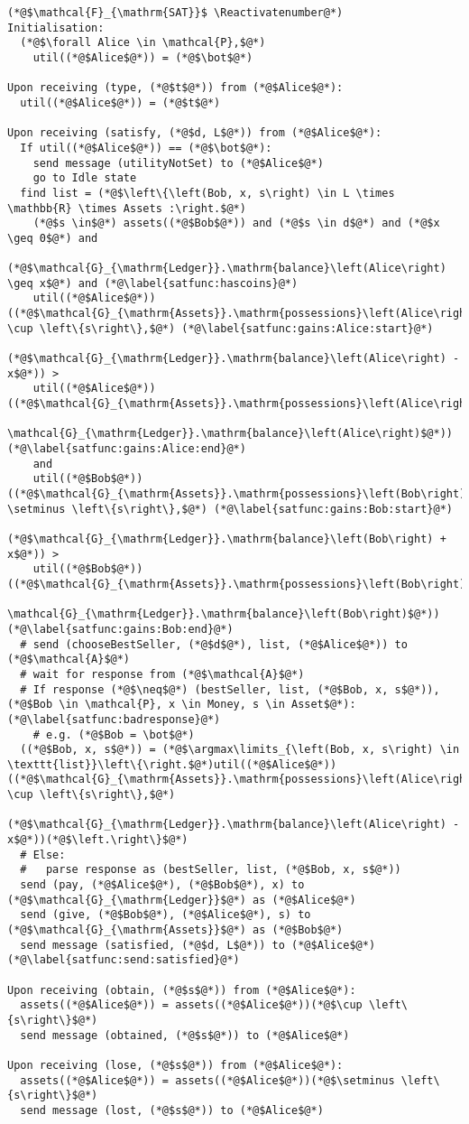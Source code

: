 \Suppressnumber
\begin{lstlisting}[label=satfunc, style=numbers]
(*@$\mathcal{F}_{\mathrm{SAT}}$ \Reactivatenumber@*)
Initialisation:
  (*@$\forall Alice \in \mathcal{P},$@*)
    util((*@$Alice$@*)) = (*@$\bot$@*)

Upon receiving (type, (*@$t$@*)) from (*@$Alice$@*):
  util((*@$Alice$@*)) = (*@$t$@*)

Upon receiving (satisfy, (*@$d, L$@*)) from (*@$Alice$@*):
  If util((*@$Alice$@*)) == (*@$\bot$@*):
    send message (utilityNotSet) to (*@$Alice$@*)
    go to Idle state
  find list = (*@$\left\{\left(Bob, x, s\right) \in L \times \mathbb{R} \times Assets :\right.$@*)
    (*@$s \in$@*) assets((*@$Bob$@*)) and (*@$s \in d$@*) and (*@$x \geq 0$@*) and
    (*@$\mathcal{G}_{\mathrm{Ledger}}.\mathrm{balance}\left(Alice\right) \geq x$@*) and (*@\label{satfunc:hascoins}@*)
    util((*@$Alice$@*))((*@$\mathcal{G}_{\mathrm{Assets}}.\mathrm{possessions}\left(Alice\right) \cup \left\{s\right\},$@*) (*@\label{satfunc:gains:Alice:start}@*)
        (*@$\mathcal{G}_{\mathrm{Ledger}}.\mathrm{balance}\left(Alice\right) - x$@*)) >
    util((*@$Alice$@*))((*@$\mathcal{G}_{\mathrm{Assets}}.\mathrm{possessions}\left(Alice\right),
    \mathcal{G}_{\mathrm{Ledger}}.\mathrm{balance}\left(Alice\right)$@*)) (*@\label{satfunc:gains:Alice:end}@*)
    and
    util((*@$Bob$@*))((*@$\mathcal{G}_{\mathrm{Assets}}.\mathrm{possessions}\left(Bob\right) \setminus \left\{s\right\},$@*) (*@\label{satfunc:gains:Bob:start}@*)
        (*@$\mathcal{G}_{\mathrm{Ledger}}.\mathrm{balance}\left(Bob\right) + x$@*)) >
    util((*@$Bob$@*))((*@$\mathcal{G}_{\mathrm{Assets}}.\mathrm{possessions}\left(Bob\right),
    \mathcal{G}_{\mathrm{Ledger}}.\mathrm{balance}\left(Bob\right)$@*)) (*@\label{satfunc:gains:Bob:end}@*)
  # send (chooseBestSeller, (*@$d$@*), list, (*@$Alice$@*)) to (*@$\mathcal{A}$@*)
  # wait for response from (*@$\mathcal{A}$@*)
  # If response (*@$\neq$@*) (bestSeller, list, (*@$Bob, x, s$@*)), (*@$Bob \in \mathcal{P}, x \in Money, s \in Asset$@*): (*@\label{satfunc:badresponse}@*)
    # e.g. (*@$Bob = \bot$@*)
  ((*@$Bob, x, s$@*)) = (*@$\argmax\limits_{\left(Bob, x, s\right) \in \texttt{list}}\left\{\right.$@*)util((*@$Alice$@*))((*@$\mathcal{G}_{\mathrm{Assets}}.\mathrm{possessions}\left(Alice\right) \cup \left\{s\right\},$@*)
        (*@$\mathcal{G}_{\mathrm{Ledger}}.\mathrm{balance}\left(Alice\right) - x$@*))(*@$\left.\right\}$@*)
  # Else:
  #   parse response as (bestSeller, list, (*@$Bob, x, s$@*))
  send (pay, (*@$Alice$@*), (*@$Bob$@*), x) to (*@$\mathcal{G}_{\mathrm{Ledger}}$@*) as (*@$Alice$@*)
  send (give, (*@$Bob$@*), (*@$Alice$@*), s) to (*@$\mathcal{G}_{\mathrm{Assets}}$@*) as (*@$Bob$@*)
  send message (satisfied, (*@$d, L$@*)) to (*@$Alice$@*) (*@\label{satfunc:send:satisfied}@*)

Upon receiving (obtain, (*@$s$@*)) from (*@$Alice$@*):
  assets((*@$Alice$@*)) = assets((*@$Alice$@*))(*@$\cup \left\{s\right\}$@*)
  send message (obtained, (*@$s$@*)) to (*@$Alice$@*)

Upon receiving (lose, (*@$s$@*)) from (*@$Alice$@*):
  assets((*@$Alice$@*)) = assets((*@$Alice$@*))(*@$\setminus \left\{s\right\}$@*)
  send message (lost, (*@$s$@*)) to (*@$Alice$@*)
\end{lstlisting}
